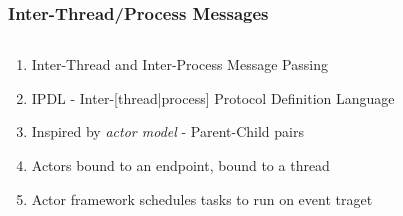 \documentclass[
	notes=none,
	aspectratio=169
]{beamer}
\begin{document}

\begin{frame}
\frametitle{}

\begin{columns}[T]
\begin{column}[T]{1.048\textwidth}
\setlength{\parskip}{1.048em}

\vspace{0.5cm}





\end{column}
\end{columns}

\end{frame}
\note{
\begin{enumerate}
\item -
\end{enumerate}
}


\begin{frame}
\frametitle{Inter-Thread/Process Messages}

\begin{columns}[T]
\begin{column}[T]{1.0\textwidth}
\setlength{\parskip}{0.5em}

\vspace{1.0cm}
\begin{enumerate}
\setlength{\parskip}{0.5em}
\item Inter-Thread and Inter-Process Message Passing
\item IPDL - Inter-[thread|process] Protocol Definition Language
\item Inspired by {\it actor model\/} - Parent-Child pairs
\item Actors bound to an endpoint, bound to a thread
\item Actor framework schedules tasks to run on event traget
\end{enumerate}

\end{column}
\end{columns}

\end{frame}
\end{document}
